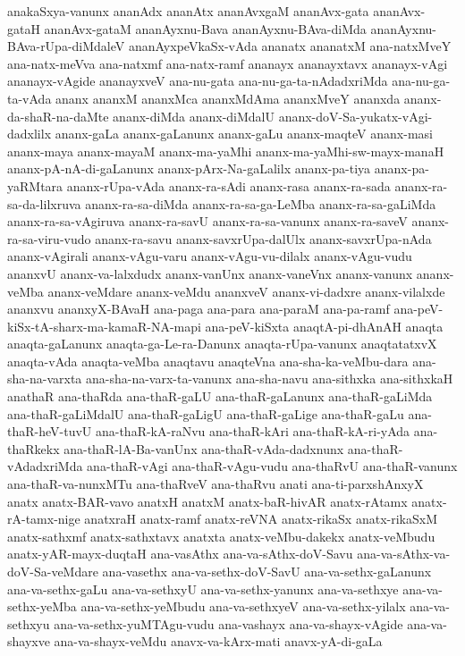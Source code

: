 {anakaSxya-vanunx
ananAdx
ananAtx
ananAvxgaM
ananAvx-gata
ananAvx-gataH
ananAvx-gataM
ananAyxnu-Bava
ananAyxnu-BAva-diMda
ananAyxnu-BAva-rUpa-diMdaleV
ananAyxpeVkaSx-vAda
ananatx
ananatxM
ana-natxMveY
ana-natx-meVva
ana-natxmf
ana-natx-ramf
ananayx
ananayxtavx
ananayx-vAgi
ananayx-vAgide
ananayxveV
ana-nu-gata
ana-nu-ga-ta-nAdadxriMda
ana-nu-ga-ta-vAda
ananx
ananxM
ananxMca
ananxMdAma
ananxMveY
ananxda
ananx-da-shaR-na-daMte
ananx-diMda
ananx-diMdalU
ananx-doV-Sa-yukatx-vAgi-dadxlilx
ananx-gaLa
ananx-gaLanunx
ananx-gaLu
ananx-maqteV
ananx-masi
ananx-maya
ananx-mayaM
ananx-ma-yaMhi
ananx-ma-yaMhi-sw-mayx-manaH
ananx-pA-nA-di-gaLanunx
ananx-pArx-Na-gaLalilx
ananx-pa-tiya
ananx-pa-yaRMtara
ananx-rUpa-vAda
ananx-ra-sAdi
ananx-rasa
ananx-ra-sada
ananx-ra-sa-da-lilxruva
ananx-ra-sa-diMda
ananx-ra-sa-ga-LeMba
ananx-ra-sa-gaLiMda
ananx-ra-sa-vAgiruva
ananx-ra-savU
ananx-ra-sa-vanunx
ananx-ra-saveV
ananx-ra-sa-viru-vudo
ananx-ra-savu
ananx-savxrUpa-dalUlx
ananx-savxrUpa-nAda
ananx-vAgirali
ananx-vAgu-varu
ananx-vAgu-vu-dilalx
ananx-vAgu-vudu
ananxvU
ananx-va-lalxdudx
ananx-vanUnx
ananx-vaneVnx
ananx-vanunx
ananx-veMba
ananx-veMdare
ananx-veMdu
ananxveV
ananx-vi-dadxre
ananx-vilalxde
ananxvu
ananxyX-BAvaH
ana-paga
ana-para
ana-paraM
ana-pa-ramf
ana-peV-kiSx-tA-sharx-ma-kamaR-NA-mapi
ana-peV-kiSxta
anaqtA-pi-dhAnAH
anaqta
anaqta-gaLanunx
anaqta-ga-Le-ra-Danunx
anaqta-rUpa-vanunx
anaqtatatxvX
anaqta-vAda
anaqta-veMba
anaqtavu
anaqteVna
ana-sha-ka-veMbu-dara
ana-sha-na-varxta
ana-sha-na-varx-ta-vanunx
ana-sha-navu
ana-sithxka
ana-sithxkaH
anathaR
ana-thaRda
ana-thaR-gaLU
ana-thaR-gaLanunx
ana-thaR-gaLiMda
ana-thaR-gaLiMdalU
ana-thaR-gaLigU
ana-thaR-gaLige
ana-thaR-gaLu
ana-thaR-heV-tuvU
ana-thaR-kA-raNvu
ana-thaR-kAri
ana-thaR-kA-ri-yAda
ana-thaRkekx
ana-thaR-lA-Ba-vanUnx
ana-thaR-vAda-dadxnunx
ana-thaR-vAdadxriMda
ana-thaR-vAgi
ana-thaR-vAgu-vudu
ana-thaRvU
ana-thaR-vanunx
ana-thaR-va-nunxMTu
ana-thaRveV
ana-thaRvu
anati
ana-ti-parxshAnxyX
anatx
anatx-BAR-vavo
anatxH
anatxM
anatx-baR-hivAR
anatx-rAtamx
anatx-rA-tamx-nige
anatxraH
anatx-ramf
anatx-reVNA
anatx-rikaSx
anatx-rikaSxM
anatx-sathxmf
anatx-sathxtavx
anatxta
anatx-veMbu-dakekx
anatx-veMbudu
anatx-yAR-mayx-duqtaH
ana-vasAthx
ana-va-sAthx-doV-Savu
ana-va-sAthx-va-doV-Sa-veMdare
ana-vasethx
ana-va-sethx-doV-SavU
ana-va-sethx-gaLanunx
ana-va-sethx-gaLu
ana-va-sethxyU
ana-va-sethx-yanunx
ana-va-sethxye
ana-va-sethx-yeMba
ana-va-sethx-yeMbudu
ana-va-sethxyeV
ana-va-sethx-yilalx
ana-va-sethxyu
ana-va-sethx-yuMTAgu-vudu
ana-vashayx
ana-va-shayx-vAgide
ana-va-shayxve
ana-va-shayx-veMdu
anavx-va-kArx-mati
anavx-yA-di-gaLa
}
